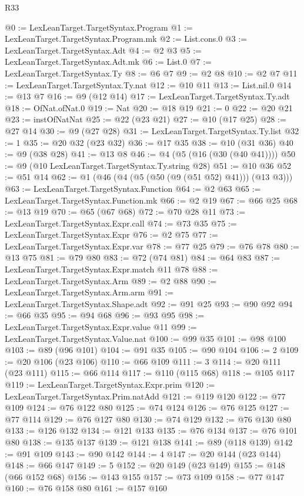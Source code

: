 \begin{lexlean}{R33}
\begin{coremodule}
{{{{{{{{{{{{{{{{{{{{{@0 := LexLeanTarget.TargetSyntax.Program
@1 := LexLeanTarget.TargetSyntax.Program.mk
@2 := List.cons.{0}
@3 := LexLeanTarget.TargetSyntax.Adt
@4 := @2 @3
@5 := LexLeanTarget.TargetSyntax.Adt.mk
@6 := List.{0}
@7 := LexLeanTarget.TargetSyntax.Ty
@8 := @6 @7
@9 := @2 @8
@10 := @2 @7
@11 := LexLeanTarget.TargetSyntax.Ty.nat
@12 := @10 @11
@13 := List.nil.{0}
@14 := @13 @7
@16 := @9 (@12 @14)
@17 := LexLeanTarget.TargetSyntax.Ty.adt
@18 := OfNat.ofNat.{0}
@19 := Nat
@20 := @18 @19
@21 := 0
@22 := @20 @21
@23 := instOfNatNat
@25 := @22 (@23 @21)
@27 := @10 (@17 @25)
@28 := @27 @14
@30 := @9 (@27 @28)
@31 := LexLeanTarget.TargetSyntax.Ty.list
@32 := 1
@35 := @20 @32 (@23 @32)
@36 := @17 @35
@38 := @10 (@31 @36)
@40 := @9 (@38 @28)
@41 := @13 @8
@46 := @4 (@5 (@16 (@30 (@40 @41))))
@50 := @9 (@10 LexLeanTarget.TargetSyntax.Ty.string @28)
@51 := @10 @36
@52 := @51 @14
@62 := @1 (@46 (@4 (@5 (@50 (@9 (@51 @52) @41))) (@13 @3)))
@63 := LexLeanTarget.TargetSyntax.Function
@64 := @2 @63
@65 := LexLeanTarget.TargetSyntax.Function.mk
@66 := @2 @19
@67 := @66 @25
@68 := @13 @19
@70 := @65 (@67 @68)
@72 := @70 @28 @11
@73 := LexLeanTarget.TargetSyntax.Expr.call
@74 := @73 @35
@75 := LexLeanTarget.TargetSyntax.Expr
@76 := @2 @75
@77 := LexLeanTarget.TargetSyntax.Expr.var
@78 := @77 @25
@79 := @76 @78
@80 := @13 @75
@81 := @79 @80
@83 := @72 (@74 @81)
@84 := @64 @83
@87 := LexLeanTarget.TargetSyntax.Expr.match @11 @78
@88 := LexLeanTarget.TargetSyntax.Arm
@89 := @2 @88
@90 := LexLeanTarget.TargetSyntax.Arm.arm
@91 := LexLeanTarget.TargetSyntax.Shape.adt
@92 := @91 @25
@93 := @90 @92
@94 := @66 @35
@95 := @94 @68
@96 := @93 @95
@98 := LexLeanTarget.TargetSyntax.Expr.value @11
@99 := LexLeanTarget.TargetSyntax.Value.nat
@100 := @99 @35
@101 := @98 @100
@103 := @89 (@96 @101)
@104 := @91 @35
@105 := @90 @104
@106 := 2
@109 := @20 @106 (@23 @106)
@110 := @66 @109
@111 := 3
@114 := @20 @111 (@23 @111)
@115 := @66 @114
@117 := @110 (@115 @68)
@118 := @105 @117
@119 := LexLeanTarget.TargetSyntax.Expr.prim
@120 := LexLeanTarget.TargetSyntax.Prim.natAdd
@121 := @119 @120
@122 := @77 @109
@124 := @76 @122 @80
@125 := @74 @124
@126 := @76 @125
@127 := @77 @114
@129 := @76 @127 @80
@130 := @74 @129
@132 := @76 @130 @80
@133 := @126 @132
@134 := @121 @133
@135 := @76 @134
@137 := @76 @101 @80
@138 := @135 @137
@139 := @121 @138
@141 := @89 (@118 @139)
@142 := @91 @109
@143 := @90 @142
@144 := 4
@147 := @20 @144 (@23 @144)
@148 := @66 @147
@149 := 5
@152 := @20 @149 (@23 @149)
@155 := @148 (@66 @152 @68)
@156 := @143 @155
@157 := @73 @109
@158 := @77 @147
@160 := @76 @158 @80
@161 := @157 @160
}}}}}}}}}}}}}}}}}}}}}
\end{coremodule}
\end{lexlean}
